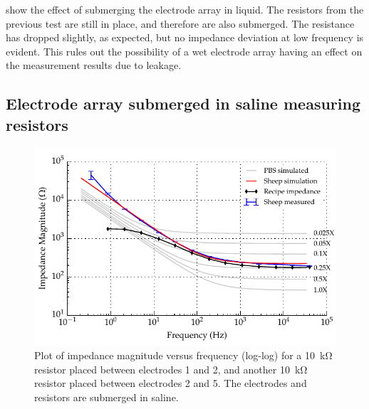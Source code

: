  show the effect of submerging the electrode array in liquid. The resistors from the previous test are still in place, and therefore are also submerged.
The resistance has dropped slightly, as expected, but no impedance deviation at low frequency is evident.
This rules out the possibility of a wet electrode array having an effect on the measurement results due to leakage.

\subsection{Electrode array submerged in saline measuring resistors}

\begin{figure}
    \centering
    \includegraphics[width=\textwidth]{content/appendices/Solution-Impedance-Measurements/graphics/run14_calibration_10k_water_salt_amended_ZVsF_graph_mag}
    \caption{\label{fig:calibration_10kRes_saline_mag}Plot of impedance magnitude versus frequency (log-log) for a \SI{10}{\kilo\ohm} resistor placed between electrodes 1 and 2, and another \SI{10}{\kilo\ohm} resistor placed between electrodes 2 and 5. The electrodes and resistors are submerged in saline.}
\end{figure}

